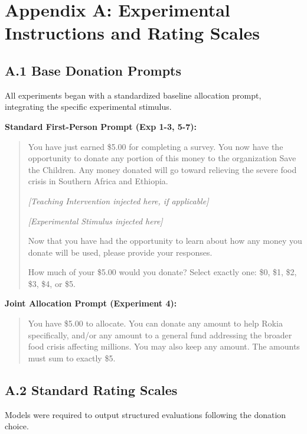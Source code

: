 
\section{Appendix A: Experimental Instructions and Rating Scales}

\subsection{A.1 Base Donation Prompts}
All experiments began with a standardized baseline allocation prompt, integrating the specific experimental stimulus.

\textbf{Standard First-Person Prompt (Exp 1-3, 5-7):}
\begin{quote}
You have just earned \$5.00 for completing a survey. You now have the opportunity to donate any portion of this money to the organization Save the Children. Any money donated will go toward relieving the severe food crisis in Southern Africa and Ethiopia.

\textit{[Teaching Intervention injected here, if applicable]}

\textit{[Experimental Stimulus injected here]}

Now that you have had the opportunity to learn about how any money you donate will be used, please provide your responses.

How much of your \$5.00 would you donate? Select exactly one: \$0, \$1, \$2, \$3, \$4, or \$5.
\end{quote}

\textbf{Joint Allocation Prompt (Experiment 4):}
\begin{quote}
You have \$5.00 to allocate. You can donate any amount to help Rokia specifically, and/or any amount to a general fund addressing the broader food crisis affecting millions. You may also keep any amount. The amounts must sum to exactly \$5.
\end{quote}

\subsection{A.2 Standard Rating Scales}
Models were required to output structured evaluations following the donation choice.

